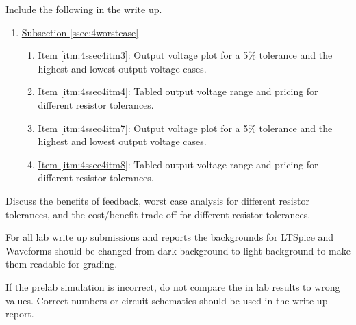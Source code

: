 Include the following in the write up.

\begin{enumerate}
	\item \hyperref[ssec:4worstcase]{Subsection \ref*{ssec:4worstcase}}
		\begin{enumerate}
			\item \hyperref[itm:4ssec4itm3]{Item \ref*{itm:4ssec4itm3}}: Output voltage plot for a 5\% tolerance and the highest and lowest output voltage cases. 
			\item \hyperref[itm:4ssec4itm4]{Item \ref*{itm:4ssec4itm4}}: Tabled output voltage range and pricing for different resistor tolerances. 
			\item \hyperref[itm:4ssec4itm7]{Item \ref*{itm:4ssec4itm7}}: Output voltage plot for a 5\% tolerance and the highest and lowest output voltage cases. 
			\item \hyperref[itm:4ssec4itm8]{Item \ref*{itm:4ssec4itm8}}: Tabled output voltage range and pricing for different resistor tolerances. 
		\end{enumerate}
\end{enumerate}

Discuss the benefits of feedback, worst case analysis for different resistor tolerances, and the cost/benefit trade off for different resistor tolerances.

For all lab write up submissions and reports the backgrounds for LTSpice and Waveforms should be changed from dark background to light background to make them readable for grading. 

If the prelab simulation is incorrect, do not compare the in lab results to wrong values.  Correct numbers or circuit schematics should be used in the write-up report.

